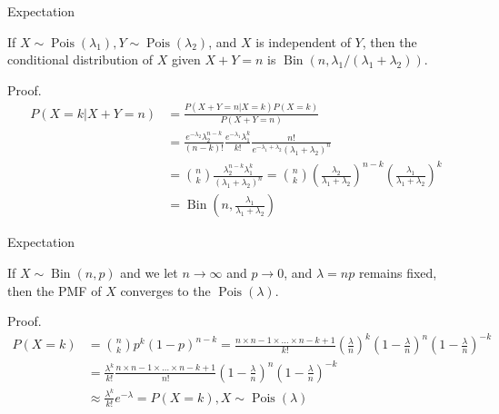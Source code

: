 \documentclass[8pt]{beamer}
\newcommand{\mypois}[1]{\operatorname{Pois}(#1)}
\newcommand{\mybin}[2]{\operatorname{Bin}\!\left(#1,#2\right)}
\newcommand{\mytoinf}[1]{#1 \rightarrow \infty}
\begin{document}
\begin{frame}{Expectation}
    \begin{theorem}
        If \(X \sim \operatorname{Pois}(\lambda_1), Y \sim \operatorname{Pois}(\lambda_2)\), and \(X\) is independent of \(Y\), then the conditional distribution of \(X\) given \(X+Y=n\) is \(\operatorname{Bin}(n, \lambda_1 / (\lambda_1 + \lambda_2))\).
    \end{theorem}
    Proof. 
    \[
    \begin{aligned}
        P(X=k|X+Y=n) &= \frac{P(X+Y=n|X=k)P(X=k)}{P(X+Y=n)} \\
        &= \frac{e^{-\lambda_2}\lambda_2^{n-k}}{(n-k)!} \frac{e^{-\lambda_1} \lambda_1^{k}}{k!} \frac{n!}{e^{-\lambda_1 + \lambda_2}(\lambda_1 + \lambda_2)^{n}} \\
        &= \binom{n}{k} \frac{\lambda_2^{n-k}\lambda_1^{k}}{(\lambda_1 +\lambda_2)^{n}} = \binom{n}{k} \left(\frac{\lambda_2}{\lambda_1+\lambda_2}\right)^{n-k} \left(\frac{\lambda_1}{\lambda_1 + \lambda_2}\right)^k \\ 
        &= \mybin{n}{\frac{\lambda_1}{\lambda_1 + \lambda_2}}
    \end{aligned}
    \]
\end{frame}

\begin{frame}{Expectation}
    \begin{theorem}
        If \(X \sim \mybin{n}{p}\) and we let \(\mytoinf{n}\) and \(p \rightarrow 0\), and $\lambda = np$ remains fixed, then the PMF of \(X\) converges to the \(\mypois{\lambda}\).
    \end{theorem}
    Proof.
    \[
    \begin{aligned}
        P(X=k) &= \binom{n}{k}p^k (1-p)^{n-k}
        = \frac{n \times n-1 \times \dots \times n-k+1}{k!} \left(\frac{\lambda}{n}\right)^k \left(1- \frac{\lambda}{n}\right)^n\left(1- \frac{\lambda}{n}\right)^{-k} \\
        &= \frac{\lambda^k}{k!} \frac{n \times n-1 \times \dots \times n-k+1}{n!} \left(1- \frac{\lambda}{n}\right)^n\left(1- \frac{\lambda}{n}\right)^{-k} \\
        &\approx \frac{\lambda^k}{k!} e^{-\lambda} = P(X=k), X \sim \mypois{\lambda}
    \end{aligned}
    \]
\end{frame}
\end{document}
